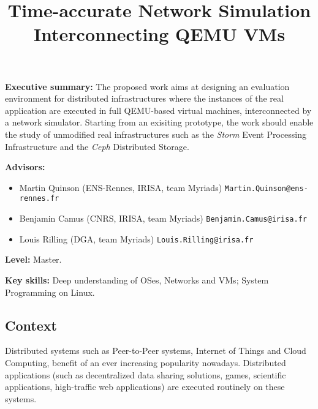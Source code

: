 \documentclass[a4paper,11pt]{article}
\begin{document}
\title{Time-accurate Network Simulation\\ Interconnecting QEMU VMs}

\author{}

\date{}
\maketitle

\vspace{-1.2cm}

\pagestyle{empty}
\thispagestyle{empty}

\noindent \textbf{Executive summary:} The proposed work aims at
designing an evaluation environment for distributed infrastructures
where the instances of the real application are executed in full
QEMU-based virtual machines, interconnected by a network simulator.
Starting from an exisiting prototype, the work should enable the study
of unmodified real infrastructures such as the \textit{Storm} Event
Processing Infrastructure and the \textit{Ceph} Distributed Storage.

\noindent\textbf{Advisors:}\vspace{-.6\baselineskip}
\begin{itemize}
\item Martin Quinson (ENS-Rennes, IRISA, team Myriads)
  \texttt{Martin.Quinson@ens-rennes.fr}\vspace{-.5\baselineskip} 
\item Benjamin Camus (CNRS, IRISA, team Myriads)
  \texttt{Benjamin.Camus@irisa.fr}\vspace{-.5\baselineskip} 
\item Louis Rilling (DGA, team Myriads) \texttt{Louis.Rilling@irisa.fr} 
\end{itemize}\vspace{-.5\baselineskip}

\noindent \textbf{Level:} Master.

\noindent \textbf{Key skills:} Deep understanding of OSes, Networks
and VMs; System Programming on Linux.


\medskip
\subsection*{Context}

Distributed systems such as Peer-to-Peer systems, Internet of Things
and Cloud Computing, benefit of an ever increasing popularity
nowadays.  Distributed applications (such as decentralized data
sharing solutions, games, scientific applications, high-traffic web
applications) are executed routinely on these systems.
\end{document}
